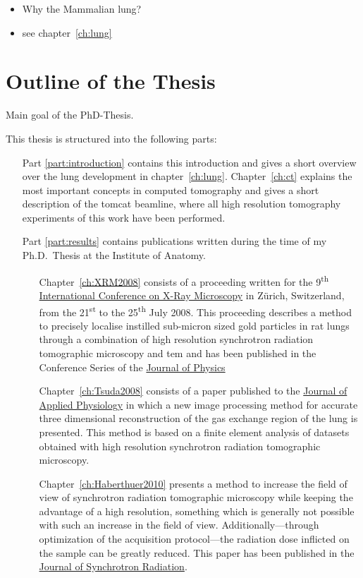 \begin{itemize}
	\item Why the Mammalian lung?
	\item see chapter~\ref{ch:lung}
\end{itemize}

\section{Outline of the Thesis}
Main goal of the PhD-Thesis.

This thesis is structured into the following parts:

\begin{itemize}
	\item [Part \ref{part:introduction}] contains this introduction and gives a short overview over the lung development in chapter~\ref{ch:lung}. Chapter~\ref{ch:ct} explains the most important concepts in computed tomography and gives a short description of the \acf{tomcat} beamline, where all high resolution tomography experiments of this work have been performed.
	\item [Part \ref{part:results}] contains publications written during the time of my Ph.D.\ Thesis at the Institute of Anatomy.
	\begin{itemize}
		\item [Chapter~\ref{ch:XRM2008}] consists of a proceeding written for the 9\textsuperscript{th} \href{http://xrm2008.web.psi.ch/}{International Conference on X-Ray Microscopy} in Zürich, Switzerland, from the 21\textsuperscript{st} to the 25\textsuperscript{th} July 2008. This proceeding describes a method to precisely localise instilled sub-micron sized gold particles in rat lungs through a combination of high resolution synchrotron radiation tomographic microscopy and \acl{tem} and has been published in the Conference Series of the \href{http://iopscience.iop.org/1742-6596/}{Journal of Physics}
		\item [Chapter~\ref{ch:Tsuda2008}] consists of a paper published to the \href{http://jap.physiology.org/}{Journal of Applied Physiology} in which a new image processing method for accurate three dimensional reconstruction of the gas exchange region of the lung is presented. This method is based on a finite element analysis of datasets obtained with high resolution synchrotron radiation tomographic microscopy.
		\item [Chapter~\ref{ch:Haberthuer2010}] presents a method to increase the field of view of synchrotron radiation tomographic microscopy while keeping the advantage of a high resolution, something which is generally not possible with such an increase in the field of view. Additionally---through optimization of the acquisition protocol---the radiation dose inflicted on the sample can be greatly reduced. This paper has been published in the \href{http://journals.iucr.org/s/}{Journal of Synchrotron Radiation}.

\end{itemize}
\end{itemize}
